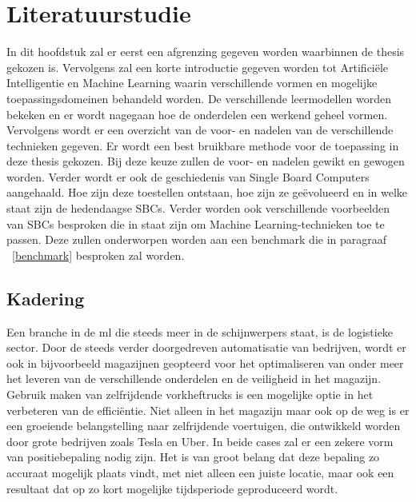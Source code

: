 \chapter{Literatuurstudie}

In dit hoofdstuk zal er eerst een afgrenzing gegeven worden waarbinnen de thesis gekozen is. Vervolgens zal een korte introductie gegeven worden tot Artifici\"ele Intelligentie en Machine Learning waarin verschillende vormen en mogelijke toepassingsdomeinen behandeld worden. De verschillende leermodellen worden bekeken en er wordt nagegaan hoe de onderdelen een werkend geheel vormen. Vervolgens wordt er een overzicht van de voor- en nadelen van de verschillende technieken gegeven. Er wordt een best bruikbare methode voor de toepassing in deze thesis gekozen. Bij deze keuze zullen de voor- en nadelen gewikt en gewogen worden. Verder wordt er ook de geschiedenis van Single Board Computers aangehaald. Hoe zijn deze toestellen ontstaan, hoe zijn ze ge\"evolueerd en in welke staat zijn de hedendaagse SBCs. Verder worden ook verschillende voorbeelden van SBCs besproken die in staat zijn om Machine Learning-technieken toe te passen. Deze zullen onderworpen worden aan een benchmark die in paragraaf ~\ref{benchmark} besproken zal worden.


\newpage

\section{Kadering}

Een branche in de \gls{ml} die steeds meer in de schijnwerpers staat, is de logistieke sector\cite{barreto2017industry}. Door de steeds verder doorgedreven automatisatie van bedrijven, wordt er ook in bijvoorbeeld magazijnen geopteerd voor het optimaliseren van onder meer het leveren van de verschillende onderdelen en de veiligheid in het magazijn. Gebruik maken van zelfrijdende vorkheftrucks is een mogelijke optie in het verbeteren van de effici\"entie. Niet alleen in het magazijn maar ook op de weg is er een groeiende belangstelling naar zelfrijdende voertuigen, die ontwikkeld worden door grote bedrijven zoals Tesla en Uber. In beide cases zal er een zekere vorm van positiebepaling nodig zijn. Het is van groot belang dat deze bepaling zo accuraat mogelijk plaats vindt, met niet alleen een juiste locatie, maar ook een resultaat dat op zo kort mogelijke tijdsperiode geproduceerd wordt. 

